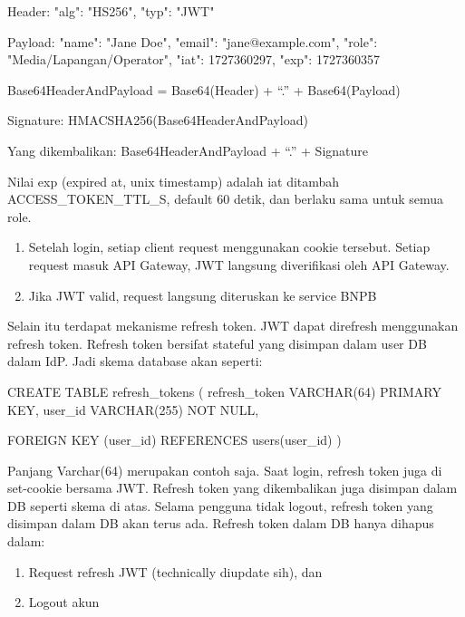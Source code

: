 \begin{codebox}
Header:
{ "alg": "HS256", "typ": "JWT" }

Payload:
{
  "name": "Jane Doe",
  "email": "jane@example.com",
  "role": "Media/Lapangan/Operator",
  "iat": 1727360297,
  "exp": 1727360357
}

Base64HeaderAndPayload = Base64(Header) + “.” + Base64(Payload)

Signature: HMACSHA256(Base64HeaderAndPayload)

Yang dikembalikan:
Base64HeaderAndPayload + “.” + Signature
\end{codebox}

Nilai exp (expired at, unix timestamp) adalah iat ditambah ACCESS\_TOKEN\_TTL\_S, default 60 detik, dan berlaku sama untuk semua role.

\begin{enumerate}
\def\labelenumi{\arabic{enumi}.}
\setcounter{enumi}{5}
\tightlist
\item
  Setelah login, setiap client request menggunakan cookie tersebut. Setiap request masuk API Gateway, JWT langsung diverifikasi oleh API Gateway.\\
\item
  Jika JWT valid, request langsung diteruskan ke service BNPB
\end{enumerate}

Selain itu terdapat mekanisme refresh token. JWT dapat direfresh menggunakan refresh token. Refresh token bersifat stateful yang disimpan dalam user DB dalam IdP. Jadi skema database akan seperti:

\begin{codebox}
CREATE TABLE refresh_tokens (
       refresh_token        VARCHAR(64) PRIMARY KEY,
       user_id              VARCHAR(255) NOT NULL,
       
       FOREIGN KEY (user_id) REFERENCES users(user_id)
)
\end{codebox}

Panjang Varchar(64) merupakan contoh saja. Saat login, refresh token juga di set-cookie bersama JWT. Refresh token yang dikembalikan juga disimpan dalam DB seperti skema di atas. Selama pengguna tidak logout, refresh token yang disimpan dalam DB akan terus ada. Refresh token dalam DB hanya dihapus dalam:

\begin{enumerate}
\def\labelenumi{\arabic{enumi}.}
\tightlist
\item
  Request refresh JWT (technically diupdate sih), dan\\
\item
  Logout akun
\end{enumerate}

